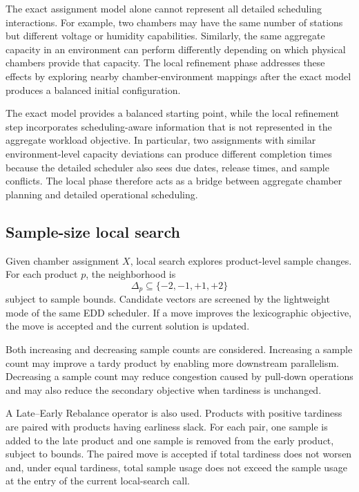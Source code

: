 \documentclass[11pt]{article}
\begin{document}
The exact assignment model alone cannot represent all detailed scheduling interactions. For example, two chambers may have the same number of stations but different voltage or humidity capabilities. Similarly, the same aggregate capacity in an environment can perform differently depending on which physical chambers provide that capacity. The local refinement phase addresses these effects by exploring nearby chamber-environment mappings after the exact model produces a balanced initial configuration.

The exact model provides a balanced starting point, while the local refinement step incorporates scheduling-aware information that is not represented in the aggregate workload objective. In particular, two assignments with similar environment-level capacity deviations can produce different completion times because the detailed scheduler also sees due dates, release times, and sample conflicts. The local phase therefore acts as a bridge between aggregate chamber planning and detailed operational scheduling.

\subsection{Sample-size local search}
\label{subsec:sample_optimization}

Given chamber assignment \(X\), local search explores product-level sample changes. For each product \(p\), the neighborhood is
\[
\Delta_p \subseteq \{-2,-1,+1,+2\}
\]
subject to sample bounds. Candidate vectors are screened by the lightweight mode of the same EDD scheduler. If a move improves the lexicographic objective, the move is accepted and the current solution is updated.

Both increasing and decreasing sample counts are considered. Increasing a sample count may improve a tardy product by enabling more downstream parallelism. Decreasing a sample count may reduce congestion caused by pull-down operations and may also reduce the secondary objective when tardiness is unchanged.

A Late--Early Rebalance operator is also used. Products with positive tardiness are paired with products having earliness slack. For each pair, one sample is added to the late product and one sample is removed from the early product, subject to bounds. The paired move is accepted if total tardiness does not worsen and, under equal tardiness, total sample usage does not exceed the sample usage at the entry of the current local-search call.
\end{document}
